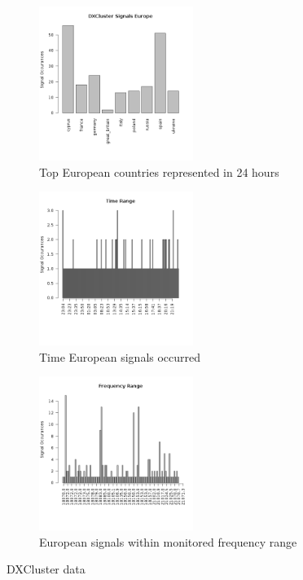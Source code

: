 \documentclass[runningheads,a4paper]{llncs}
\begin{document}
%
\begin{figure}	
	\centering
	\begin{subfigure}[t]{8cm}
		\centering
		\includegraphics[width=5cm]{images/68}
		\caption{Top European countries represented in 24 hours}\label{fig:dxcluster_country_barplot}		
	\end{subfigure}
	\quad
	\begin{subfigure}[t]{5cm}
		\centering
		\includegraphics[width=5cm]{images/69}
		\caption{Time European signals occurred}\label{fig:dxcluster_time_plot}		
	\end{subfigure}
	\quad
	\begin{subfigure}[t]{5cm}
		\centering
		\includegraphics[width=5cm]{images/70}
		\caption{European signals within monitored frequency range}\label{fig:dxcluster_frequency_plot}
	\end{subfigure}
	\caption{DXCluster data}\label{dxcluster_data}
\end{figure}
%
\end{document}
